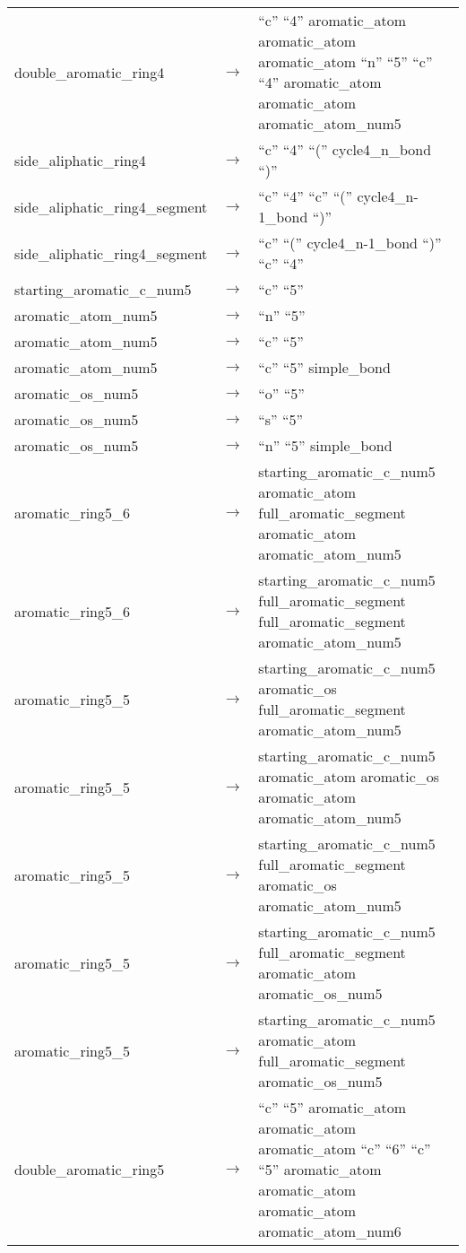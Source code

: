 \documentclass[../Document.tex]{subfiles}
\begin{document}
\begin{longtable}{m{} p{} p{}}
    double\_aromatic\_ring4 & $\rightarrow$ & ``c'' ``4'' aromatic\_atom aromatic\_atom aromatic\_atom ``n'' ``5'' ``c'' ``4'' aromatic\_atom aromatic\_atom aromatic\_atom\_num5 \\
    side\_aliphatic\_ring4 & $\rightarrow$ & ``c'' ``4'' ``('' cycle4\_n\_bond ``)'' \\
    side\_aliphatic\_ring4\_segment & $\rightarrow$ & ``c'' ``4'' ``c'' ``('' cycle4\_n-1\_bond ``)'' \\
    side\_aliphatic\_ring4\_segment & $\rightarrow$ & ``c'' ``('' cycle4\_n-1\_bond ``)'' ``c'' ``4'' \\
    starting\_aromatic\_c\_num5 & $\rightarrow$ & ``c'' ``5'' \\
    aromatic\_atom\_num5 & $\rightarrow$ & ``n'' ``5'' \\
    aromatic\_atom\_num5 & $\rightarrow$ & ``c'' ``5'' \\
    aromatic\_atom\_num5 & $\rightarrow$ & ``c'' ``5'' simple\_bond \\
    aromatic\_os\_num5 & $\rightarrow$ & ``o'' ``5'' \\
    aromatic\_os\_num5 & $\rightarrow$ & ``s'' ``5'' \\
    aromatic\_os\_num5 & $\rightarrow$ & ``n'' ``5'' simple\_bond \\
    aromatic\_ring5\_6 & $\rightarrow$ & starting\_aromatic\_c\_num5 aromatic\_atom full\_aromatic\_segment aromatic\_atom aromatic\_atom\_num5 \\
    aromatic\_ring5\_6 & $\rightarrow$ & starting\_aromatic\_c\_num5 full\_aromatic\_segment full\_aromatic\_segment aromatic\_atom\_num5 \\
    aromatic\_ring5\_5 & $\rightarrow$ & starting\_aromatic\_c\_num5 aromatic\_os full\_aromatic\_segment aromatic\_atom\_num5 \\
    aromatic\_ring5\_5 & $\rightarrow$ & starting\_aromatic\_c\_num5 aromatic\_atom aromatic\_os aromatic\_atom aromatic\_atom\_num5 \\
    aromatic\_ring5\_5 & $\rightarrow$ & starting\_aromatic\_c\_num5 full\_aromatic\_segment aromatic\_os aromatic\_atom\_num5 \\
    aromatic\_ring5\_5 & $\rightarrow$ & starting\_aromatic\_c\_num5 full\_aromatic\_segment aromatic\_atom aromatic\_os\_num5 \\
    aromatic\_ring5\_5 & $\rightarrow$ & starting\_aromatic\_c\_num5 aromatic\_atom full\_aromatic\_segment aromatic\_os\_num5 \\
    double\_aromatic\_ring5 & $\rightarrow$ & ``c'' ``5'' aromatic\_atom aromatic\_atom aromatic\_atom ``c'' ``6'' ``c'' ``5'' aromatic\_atom aromatic\_atom aromatic\_atom aromatic\_atom\_num6 \\

\end{longtable}
\end{document}
